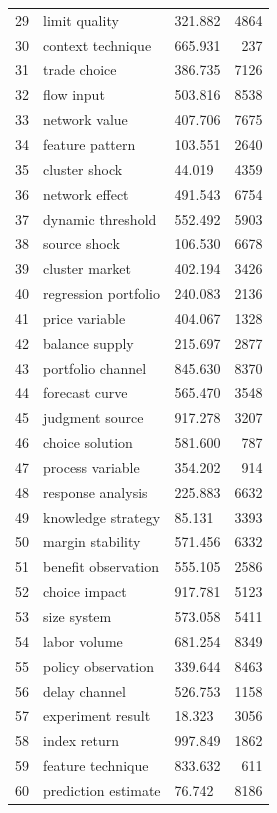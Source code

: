 \documentclass[11pt]{report}
\begin{document}
\begin{longtable}{rllr}
29 & limit quality & 321.882 & 4864 \\
30 & context technique & 665.931 & 237 \\
31 & trade choice & 386.735 & 7126 \\
32 & flow input & 503.816 & 8538 \\
33 & network value & 407.706 & 7675 \\
34 & feature pattern & 103.551 & 2640 \\
35 & cluster shock & 44.019 & 4359 \\
36 & network effect & 491.543 & 6754 \\
37 & dynamic threshold & 552.492 & 5903 \\
38 & source shock & 106.530 & 6678 \\
39 & cluster market & 402.194 & 3426 \\
40 & regression portfolio & 240.083 & 2136 \\
41 & price variable & 404.067 & 1328 \\
42 & balance supply & 215.697 & 2877 \\
43 & portfolio channel & 845.630 & 8370 \\
44 & forecast curve & 565.470 & 3548 \\
45 & judgment source & 917.278 & 3207 \\
46 & choice solution & 581.600 & 787 \\
47 & process variable & 354.202 & 914 \\
48 & response analysis & 225.883 & 6632 \\
49 & knowledge strategy & 85.131 & 3393 \\
50 & margin stability & 571.456 & 6332 \\
51 & benefit observation & 555.105 & 2586 \\
52 & choice impact & 917.781 & 5123 \\
53 & size system & 573.058 & 5411 \\
54 & labor volume & 681.254 & 8349 \\
55 & policy observation & 339.644 & 8463 \\
56 & delay channel & 526.753 & 1158 \\
57 & experiment result & 18.323 & 3056 \\
58 & index return & 997.849 & 1862 \\
59 & feature technique & 833.632 & 611 \\
60 & prediction estimate & 76.742 & 8186 \\
\end{longtable}
\end{document}
